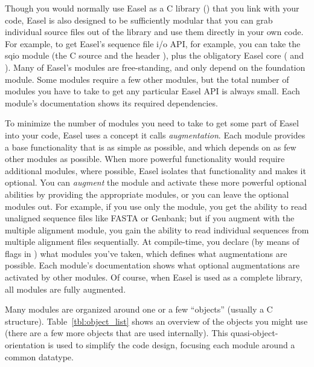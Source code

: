 Though you would normally use Easel as a C library
() that you link with your code, Easel is also
designed to be sufficiently modular that you can grab individual
source files out of the library and use them directly in your own
code. For example, to get Easel's sequence file i/o API, for example,
you can take the sqio module (the C source  and the
header ), plus the obligatory Easel core
( and ). Many of Easel's modules are
free-standing, and only depend on the foundation 
module. Some modules require a few other modules, but the total number
of modules you have to take to get any particular Easel API is always
small. Each module's documentation shows its required dependencies.

To minimize the number of modules you need to take to get some part of
Easel into your code, Easel uses a concept it calls
\emph{augmentation}. Each module provides a base functionality that is
as simple as possible, and which depends on as few other modules as
possible. When more powerful functionality would require additional
modules, where possible, Easel isolates that functionality and makes
it optional. You can \emph{augment} the module and activate these more
powerful optional abilities by providing the appropriate modules, or
you can leave the optional modules out.  For example, if you use only
the  module, you get the ability to read unaligned
sequence files like FASTA or Genbank; but if you augment 
with the  multiple alignment module, you gain the ability
to read individual sequences from multiple alignment files
sequentially. At compile-time, you declare (by means of
 flags in ) what modules you've taken,
which defines what augmentations are possible. Each module's
documentation shows what optional augmentations are activated by other
modules. Of course, when Easel is used as a complete
 library, all modules are fully augmented.




Many modules are organized around one or a few ``objects'' (usually a
C structure). Table~\ref{tbl:object_list} shows an overview of the
objects you might use (there are a few more objects that are used
internally). This quasi-object-orientation is used to simplify the
code design, focusing each module around a common datatype. 

